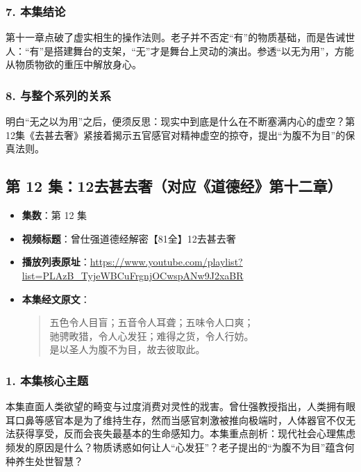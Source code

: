 \subsubsection{7. 本集结论}
第十一章点破了虚实相生的操作法则。老子并不否定“有”的物质基础，而是告诫世人：“有”是搭建舞台的支架，“无”才是舞台上灵动的演出。参透“以无为用”，方能从物质物欲的重压中解放身心。

\subsubsection{8. 与整个系列的关系}
明白“无之以为用”之后，便须反思：现实中到底是什么在不断塞满内心的虚空？第12集《去甚去奢》紧接着揭示五官感官对精神虚空的掠夺，提出“为腹不为目”的保真法则。

\clearpage

\subsection{第 12 集：12去甚去奢（对应《道德经》第十二章）}
\label{sec:ep12}

\begin{itemize}
    \item \textbf{集数}：第 12 集
    \item \textbf{视频标题}：曾仕强道德经解密【81全】12去甚去奢
    \item \textbf{播放列表原址}：\url{https://www.youtube.com/playlist?list=PLAzB_TyjeWBCuFrgnjOCwspANw9J2xaBR}
    \item \textbf{本集经文原文}：
    \begin{quote}\kaishu
    五色令人目盲；五音令人耳聋；五味令人口爽；\\
    驰骋畋猎，令人心发狂；难得之货，令人行妨。\\
    是以圣人为腹不为目，故去彼取此。
    \end{quote}
\end{itemize}

\subsubsection{1. 本集核心主题}
本集直面人类欲望的畸变与过度消费对灵性的戕害。曾仕强教授指出，人类拥有眼耳口鼻等感官本是为了维持生存，然而当感官刺激被推向极端时，人体器官不仅无法获得享受，反而会丧失最基本的生命感知力。本集重点剖析：现代社会心理焦虑频发的原因是什么？物质诱惑如何让人“心发狂”？老子提出的“为腹不为目”蕴含何种养生处世智慧？

